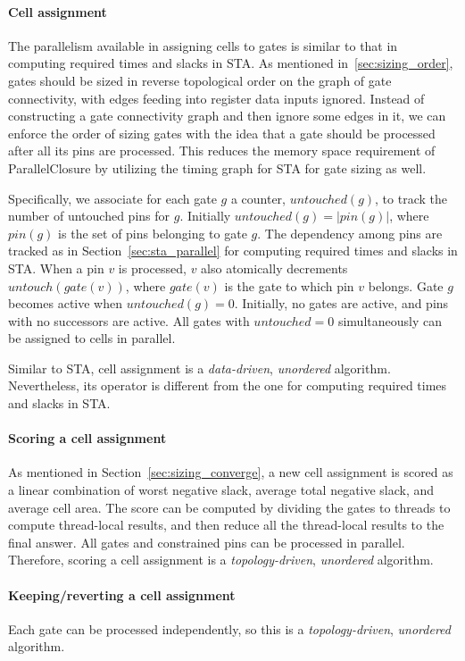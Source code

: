 \paragraph{Cell assignment} The parallelism available in assigning cells to gates is similar to that in computing required times and slacks in STA. As mentioned in~\ref{sec:sizing_order}, gates should be sized in reverse topological order on the graph of gate connectivity, with edges feeding into register data inputs ignored. Instead of constructing a gate connectivity graph and then ignore some edges in it, we can enforce the order of sizing gates with the idea that a gate should be processed after all its pins are processed. This reduces the memory space requirement of ParallelClosure by utilizing the timing graph for STA for gate sizing as well.

Specifically, we associate for each gate $g$ a counter, $untouched(g)$, to track the number of untouched pins for $g$. Initially $untouched(g) = |pin(g)|$, where $pin(g)$ is the set of pins belonging to gate $g$. The dependency among pins are tracked as in Section~\ref{sec:sta_parallel} for computing required times and slacks in STA. When a pin $v$ is processed, $v$ also atomically decrements $untouch(gate(v))$, where $gate(v)$ is the gate to which pin $v$ belongs. Gate $g$ becomes active when $untouched(g) = 0$. Initially, no gates are active, and pins with no successors are active. All gates with $untouched = 0$ simultaneously can be assigned to cells in parallel.

Similar to STA, cell assignment is a {\em data-driven}, {\em unordered} algorithm. Nevertheless, its operator is different from the one for computing required times and slacks in STA.

\paragraph{Scoring a cell assignment} As mentioned in Section~\ref{sec:sizing_converge}, a new cell assignment is scored as a linear combination of worst negative slack, average total negative slack, and average cell area. The score can be computed by dividing the gates to threads to compute thread-local results, and then reduce all the thread-local results to the final answer. All gates and constrained pins can be processed in parallel. Therefore, scoring a cell assignment is a {\em topology-driven}, {\em unordered} algorithm.

\paragraph{Keeping/reverting a cell assignment} Each gate can be processed independently, so this is a {\em topology-driven}, {\em unordered} algorithm.

